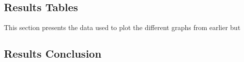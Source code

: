 
\subsection{Results Tables}

This section presents the data used to plot the different graphs from earlier but


%
%


\subsection{Results Conclusion}
